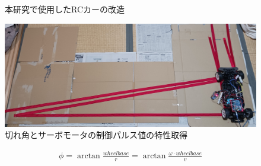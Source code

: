 \begin{figure}[h]
  \begin{center}
  \caption{本研究で使用したRCカーの改造}
  \label{auto:rc}
  \end{center}
\end{figure}

\begin{figure}[h]
  \begin{center}
    \includegraphics[width=.9\linewidth]{img/auto_35.jpg}
    \caption{切れ角とサーボモータの制御パルス値の特性取得}
    \label{auto:tokusei}
  \end{center}  
\end{figure}

\begin{align}
  \phi = \arctan\frac{wheelbase}{r} = \arctan\frac{\omega \cdot wheelbase}{v} \label{auto:eq:ackermann}
\end{align}

